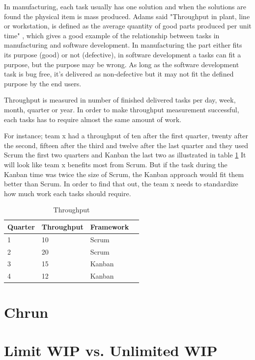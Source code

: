 \documentclass[UKenglish]{ifimaster}  %
\begin{document}
In manufacturing, each task usually has one solution and when the solutions are found the physical item is mass produced.  Adams said "Throughput in plant, line or workstation, is defined as the average quantity of good  parts produced per unit time" \parencite{Adams}, which gives a good example of the relationship between tasks in manufacturing and software development. In manufacturing the part either fits its purpose (good) or not (defective), in software development a tasks can fit a purpose, but the purpose may be wrong. As long as the software development task is bug free, it's delivered as non-defective but it may not fit the defined purpose by the end users. 

Throughput is measured in number of finished delivered tasks per day, week, month, quarter or year. In order to make throughput measurement successful, each tasks has to require almost the same amount of work.  

For instance; team x had a throughput of ten after the first quarter, twenty after the second, fifteen after the third and twelve after the last quarter and they used Scrum the first two quarters and Kanban the last two as illustrated in table \ref{tt}
It will look like team x benefits most from Scrum. But if the task during the Kanban time was twice the size of Scrum, the Kanban approach would fit them better than Scrum. In order to find that out, the team x needs to standardize how much work each tasks should require.

\begin{table}[ht]
\begin{center}
    \begin{tabular}{| l | l | l | l |}
    \hline
    Quarter & Throughput &  Framework\\ \hline
    1 & 10 & Scrum\\ \hline
    2 & 20 & Scrum \\ \hline
    3 & 15 & Kanban\\ \hline
    4 & 12 & Kanban\\ \hline
    \end{tabular}
\caption{Throughput}
\label{tt} %
\end{center}
\end{table}

\section{Chrun}

\section {Limit WIP vs. Unlimited WIP}
\end{document}
